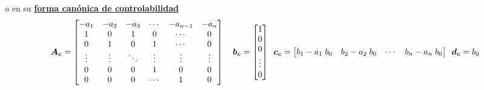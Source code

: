 o en su \underline{\textbf{forma canónica de controlabilidad}}
\begin{equation*}
    \bm{A_c} = 
    \begin{bmatrix}
    -a_1 & -a_2 & -a_3 & \cdots & -a_{n-1} & -a_n\\
    1 & 0 & 1 & 0 & \cdots & 0\\
    0 & 1 & 0 & 1 & \cdots & 0\\
    \vdots & \vdots & \ddots & \vdots & \vdots & \vdots \\
    0 & 0 & 0 & 1 & 0 & 0\\
    0 & 0 & 0 & \cdots & 1 & 0 \\
    \end{bmatrix}
    \hspace*{10pt}
    \bm{b_c} = 
    \begin{bmatrix}
    1 \\
    0 \\
    0 \\
    \vdots \\
    0\\
    \end{bmatrix}
    \hspace*{5pt}
    \bm{c_c} = 
    \begin{bmatrix}
    b_1 - a_1\; b_0 & b_2 - a_2\; b_0 & \cdots & b_n - a_n\; b_0
    \end{bmatrix}
    \hspace*{5pt}
    \bm{d_c} = b_0
\end{equation*}














